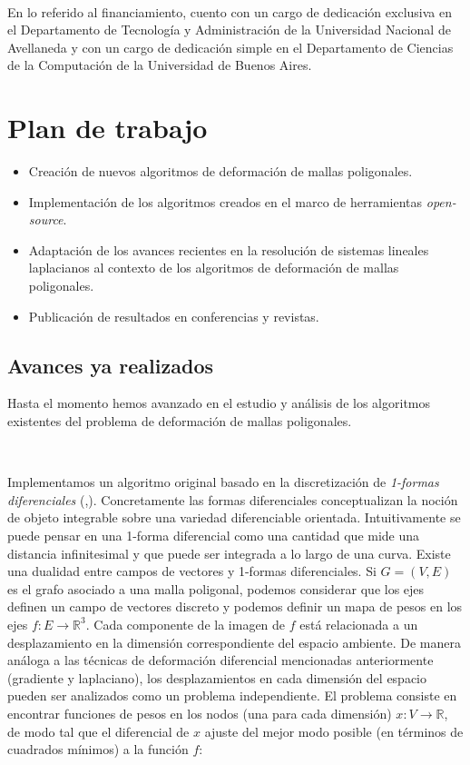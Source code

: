 \documentclass{article}
\begin{document}
\

En lo referido al financiamiento, cuento con un cargo de dedicación exclusiva 
en el Departamento de Tecnología y Administración de la Universidad Nacional 
de Avellaneda y con un cargo de dedicación simple en el Departamento de Ciencias 
de la Computación de la Universidad de Buenos Aires.

\section{Plan de trabajo}

\begin{itemize}

\item Creación de nuevos algoritmos de deformación de mallas poligonales.

\item Implementación de los algoritmos creados en el marco de herramientas 
\emph{open-source}.

\item Adaptación de los avances recientes en la resolución de sistemas lineales 
laplacianos al contexto de los algoritmos de deformación de mallas poligonales.

\item Publicación de resultados en conferencias y revistas.

\end{itemize}

\subsection{Avances ya realizados}

Hasta el momento hemos avanzado en el estudio y análisis de los algoritmos 
existentes del problema de deformación de mallas poligonales.

\

Implementamos un algoritmo original basado en la discretización de \emph{1-formas 
diferenciales} (\cite{S:1965},\cite{T:2008}). Concretamente las formas diferenciales 
conceptualizan la noción de objeto integrable sobre una variedad diferenciable 
orientada. Intuitivamente se puede pensar en una 1-forma diferencial como una 
cantidad que mide una distancia infinitesimal y que puede ser integrada a 
lo largo de una curva. Existe una dualidad entre campos de vectores y 1-formas 
diferenciales. Si $G=(V,E)$ es el grafo asociado a una malla poligonal, 
podemos considerar que los ejes definen un campo de vectores discreto y podemos 
definir un mapa de pesos en los ejes $f: E \rightarrow \mathbb{R}^3$. Cada 
componente de la imagen de $f$ está relacionada a un desplazamiento en la 
dimensión correspondiente del espacio ambiente. De manera análoga a las técnicas 
de deformación diferencial mencionadas anteriormente (gradiente y laplaciano), 
los desplazamientos en cada dimensión del espacio pueden ser analizados 
como un problema independiente. El problema consiste en encontrar funciones 
de pesos en los nodos (una para cada dimensión) $x: V \rightarrow \mathbb{R}$, 
de modo tal que el diferencial de $x$ ajuste del mejor modo posible (en 
términos de cuadrados mínimos) a la función $f$:
\end{document}
